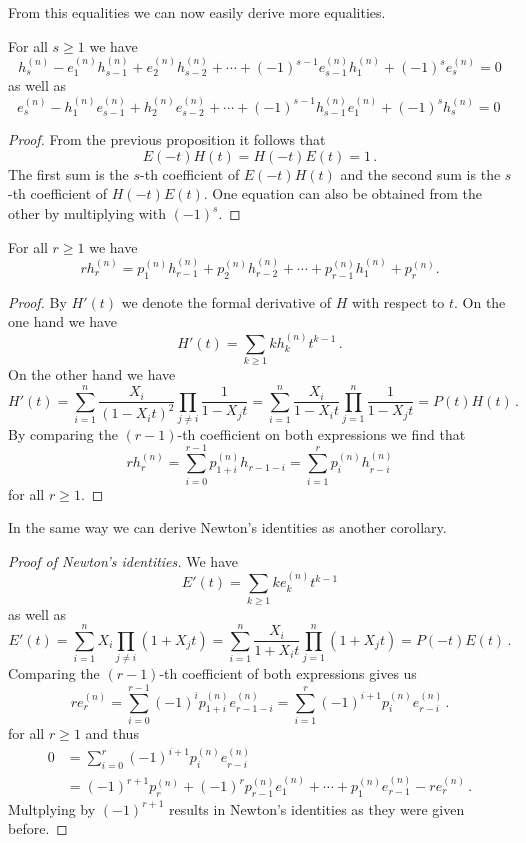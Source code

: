 From this equalities we can now easily derive more equalities.


\begin{cor}
  For all $s \geq 1$ we have
  \[
        h^{(n)}_s
      - e^{(n)}_1 h^{(n)}_{s-1}
      + e^{(n)}_2 h^{(n)}_{s-2}
      + \dotsb
      + (-1)^{s-1} e^{(n)}_{s-1} h^{(n)}_1
      + (-1)^s e^{(n)}_s
    = 0
  \]
  as well as
  \[
        e^{(n)}_s
      - h^{(n)}_1 e^{(n)}_{s-1}
      + h^{(n)}_2 e^{(n)}_{s-2}
      + \dotsb
      + (-1)^{s-1} h^{(n)}_{s-1} e^{(n)}_1
      + (-1)^s h^{(n)}_s
    = 0 \,
  \]
\end{cor}
\begin{proof}
  From the previous proposition it follows that
  \[
      E(-t)H(t)
    = H(-t)E(t) = 1 \,.
  \]
  The first sum is the $s$-th coefficient of $E(-t)H(t)$ and the second sum is the $s$-th coefficient of $H(-t)E(t)$.
  One equation can also be obtained from the other by multiplying with $(-1)^s$.
\end{proof}


\begin{cor}
  For all $r \geq 1$ we have
  \[
      r h^{(n)}_r
    =   p^{(n)}_1 h^{(n)}_{r-1}
      + p^{(n)}_2 h^{(n)}_{r-2}
      + \dotsb
      + p^{(n)}_{r-1} h^{(n)}_1
      + p^{(n)}_r.
  \]
\end{cor}
\begin{proof}
  By $H'(t)$ we denote the formal derivative of $H$ with respect to $t$.
  On the one hand we have
  \[
      H'(t)
    = \sum_{k \geq 1} k h^{(n)}_k t^{k-1} \,.
  \]
  On the other hand we have
  \[
      H'(t)
    = \sum_{i=1}^n \frac{X_i}{(1-X_i t)^2} \prod_{j \neq i} \frac{1}{1 - X_j t}
    = \sum_{i=1}^n \frac{X_i}{1 - X_i t} \prod_{j=1}^n \frac{1}{1 - X_j t}
    = P(t) H(t) \,.
  \]
  By comparing the $(r-1)$-th coefficient on both expressions we find that
  \[
      r h^{(n)}_r
    = \sum_{i=0}^{r-1} p^{(n)}_{1+i} h_{r-1-i}
    = \sum_{i=1}^r p^{(n)}_i h^{(n)}_{r-i}
  \]
  for all $r \geq 1$.
\end{proof}


In the same way we can derive Newton’s identities as another corollary.


\begin{proof}[Proof of Newton’s identities]
  We have
  \[
      E'(t)
    = \sum_{k \geq 1} k e^{(n)}_k t^{k-1}
  \]
  as well as
  \[
      E'(t)
    = \sum_{i=1}^n X_i \prod_{j \neq i} (1 + X_j t)
    = \sum_{i=1}^n \frac{X_i}{1 + X_i t} \prod_{j=1}^n (1 + X_j t)
    = P(-t)E(t) \,.
  \]
  Comparing the $(r-1)$-th coefficient of both expressions gives us
  \[
      r e^{(n)}_r
    = \sum_{i=0}^{r-1} (-1)^i p^{(n)}_{1+i} e^{(n)}_{r-1-i}
    = \sum_{i=1}^r (-1)^{i+1} p^{(n)}_i e^{(n)}_{r-i} \,.
  \]
  for all $r \geq 1$ and thus
  \begin{align*}
        0
    &=  \sum_{i=0}^r (-1)^{i+1} p^{(n)}_i e^{(n)}_{r-i} \\
    &=  (-1)^{r+1} p^{(n)}_r + (-1)^r p^{(n)}_{r-1} e^{(n)}_1 + \dotsb + p^{(n)}_1 e^{(n)}_{r-1} - r e^{(n)}_r \,.
  \end{align*}
  Multplying by $(-1)^{r+1}$ results in Newton’s identities as they were given before.
\end{proof}




